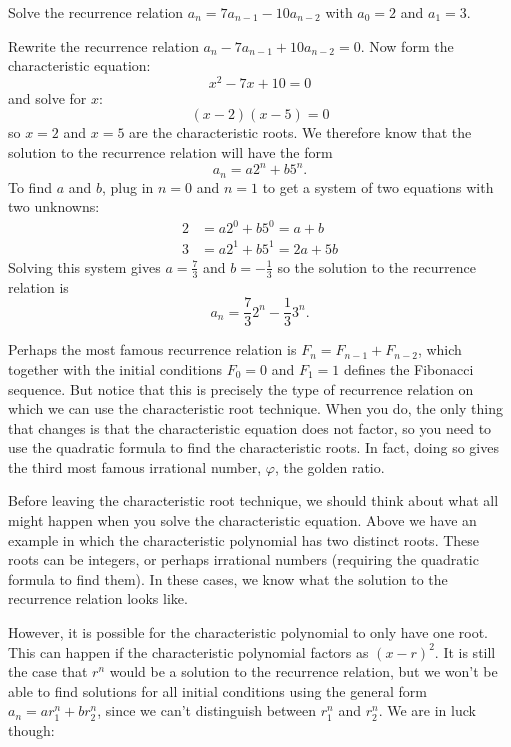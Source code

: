 \documentclass[12pt]{article}
\begin{document}
\begin{example}
  Solve the recurrence relation $a_n = 7a_{n-1} - 10 a_{n-2}$ with $a_0 = 2$ and $a_1 = 3$.
  \begin{solution}
   Rewrite the recurrence relation $a_n - 7a_{n-1} + 10a_{n-2} = 0$.  Now form the characteristic equation:
   \[x^2 - 7x + 10 = 0\]
   and solve for $x$:
   \[(x - 2) (x - 5) = 0\]
   so $x = 2$ and $x = 5$ are the characteristic roots.  We therefore know that the solution to the recurrence relation will have the form
   \[a_n = a 2^n + b 5^n.\]
   To find $a$ and $b$, plug in $n =0$ and $n = 1$ to get a system of two equations with two unknowns:
   \begin{align*}
    2 & = a 2^0 + b 5^0 = a + b\\
    3 & = a 2^1 + b 5^1 = 2a + 5b
   \end{align*}
  Solving this system gives $a = \frac{7}{3}$ and $b = -\frac{1}{3}$ so the solution to the recurrence relation is
  \[a_n = \frac{7}{3}2^n - \frac{1}{3} 3^n.\]
  \end{solution}

\end{example}

Perhaps the most famous recurrence relation is $F_n = F_{n-1} + F_{n-2}$, which together with the initial conditions $F_0 = 0$ and $F_1= 1$ defines the Fibonacci sequence.  But notice that this is precisely the type of recurrence relation on which we can use the characteristic root technique.  When you do, the only thing that changes is that the characteristic equation does not factor, so you need to use the quadratic formula to find the characteristic roots.  In fact, doing so gives the third most famous irrational number, $\varphi$, the golden ratio.

Before leaving the characteristic root technique, we should think about what all might happen when you solve the characteristic equation.  Above we have an example in which the characteristic polynomial has two distinct roots.  These roots can be integers, or perhaps irrational numbers (requiring the quadratic formula to find them).  In these cases, we know what the solution to the recurrence relation looks like.

However, it is possible for the characteristic polynomial to only have one root.  This can happen if the characteristic polynomial factors as $(x - r)^2$.  It is still the case that $r^n$ would be a solution to the recurrence relation, but we won't be able to find solutions for all initial conditions using the general form $a_n = ar_1^n + br_2^n$, since we can't distinguish between $r_1^n$ and $r_2^n$.  We are in luck though:
\end{document}
